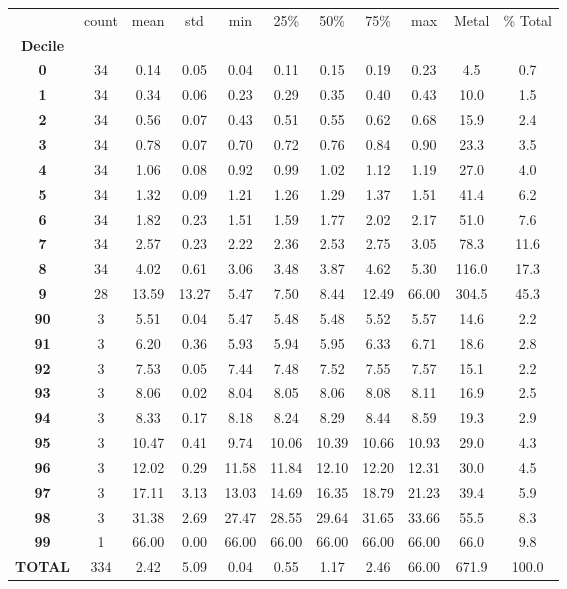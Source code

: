 \begin{tabular}{ccccccccccc}
\toprule
{} & count &  mean &   std &   min &   25\% &   50\% &   75\% &   max & Metal & \% Total \\
\textbf{Decile} &       &       &       &       &       &       &       &       &       &         \\
\midrule
\textbf{0     } &    34 &  0.14 &  0.05 &  0.04 &  0.11 &  0.15 &  0.19 &  0.23 &   4.5 &     0.7 \\
\textbf{1     } &    34 &  0.34 &  0.06 &  0.23 &  0.29 &  0.35 &  0.40 &  0.43 &  10.0 &     1.5 \\
\textbf{2     } &    34 &  0.56 &  0.07 &  0.43 &  0.51 &  0.55 &  0.62 &  0.68 &  15.9 &     2.4 \\
\textbf{3     } &    34 &  0.78 &  0.07 &  0.70 &  0.72 &  0.76 &  0.84 &  0.90 &  23.3 &     3.5 \\
\textbf{4     } &    34 &  1.06 &  0.08 &  0.92 &  0.99 &  1.02 &  1.12 &  1.19 &  27.0 &     4.0 \\
\textbf{5     } &    34 &  1.32 &  0.09 &  1.21 &  1.26 &  1.29 &  1.37 &  1.51 &  41.4 &     6.2 \\
\textbf{6     } &    34 &  1.82 &  0.23 &  1.51 &  1.59 &  1.77 &  2.02 &  2.17 &  51.0 &     7.6 \\
\textbf{7     } &    34 &  2.57 &  0.23 &  2.22 &  2.36 &  2.53 &  2.75 &  3.05 &  78.3 &    11.6 \\
\textbf{8     } &    34 &  4.02 &  0.61 &  3.06 &  3.48 &  3.87 &  4.62 &  5.30 & 116.0 &    17.3 \\
\textbf{9     } &    28 & 13.59 & 13.27 &  5.47 &  7.50 &  8.44 & 12.49 & 66.00 & 304.5 &    45.3 \\
\textbf{90    } &     3 &  5.51 &  0.04 &  5.47 &  5.48 &  5.48 &  5.52 &  5.57 &  14.6 &     2.2 \\
\textbf{91    } &     3 &  6.20 &  0.36 &  5.93 &  5.94 &  5.95 &  6.33 &  6.71 &  18.6 &     2.8 \\
\textbf{92    } &     3 &  7.53 &  0.05 &  7.44 &  7.48 &  7.52 &  7.55 &  7.57 &  15.1 &     2.2 \\
\textbf{93    } &     3 &  8.06 &  0.02 &  8.04 &  8.05 &  8.06 &  8.08 &  8.11 &  16.9 &     2.5 \\
\textbf{94    } &     3 &  8.33 &  0.17 &  8.18 &  8.24 &  8.29 &  8.44 &  8.59 &  19.3 &     2.9 \\
\textbf{95    } &     3 & 10.47 &  0.41 &  9.74 & 10.06 & 10.39 & 10.66 & 10.93 &  29.0 &     4.3 \\
\textbf{96    } &     3 & 12.02 &  0.29 & 11.58 & 11.84 & 12.10 & 12.20 & 12.31 &  30.0 &     4.5 \\
\textbf{97    } &     3 & 17.11 &  3.13 & 13.03 & 14.69 & 16.35 & 18.79 & 21.23 &  39.4 &     5.9 \\
\textbf{98    } &     3 & 31.38 &  2.69 & 27.47 & 28.55 & 29.64 & 31.65 & 33.66 &  55.5 &     8.3 \\
\textbf{99    } &     1 & 66.00 &  0.00 & 66.00 & 66.00 & 66.00 & 66.00 & 66.00 &  66.0 &     9.8 \\
\textbf{TOTAL } &   334 &  2.42 &  5.09 &  0.04 &  0.55 &  1.17 &  2.46 & 66.00 & 671.9 &   100.0 \\
\bottomrule
\end{tabular}
